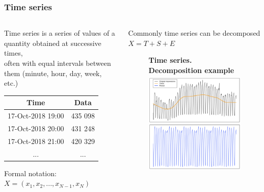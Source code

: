 \documentclass[intlimits, 9pt, unicode]{beamer}
\begin{document}
\begin{frame}
    \frametitle{Time series}
	
    {\begin{columns}
        \begin{column}{5.5cm}
 Time series is a series of values of a quantity obtained at successive times,\\ often with equal intervals between them (minute, hour, day, week, etc.)

\vspace{0.3cm}
\begin{table}[h!]
\centering
 \begin{tabular}{||c c||}
 \hline
 Time & Data \\ [0.5ex]
 \hline\hline
 17-Oct-2018 19:00 & 435 098 \\
 \hline
 17-Oct-2018 20:00 & 431 248  \\
 \hline
 17-Oct-2018 21:00 & 420 329  \\
 \hline
 ... & ... \\ [1ex]
 \hline
\end{tabular}
\end{table}

	
\vspace{0.3cm} Formal notation:
 $ X = (x_1, x_2, ... , x_{N-1} , x_N)  $

        \end{column}

\hspace{-0.5cm}
        \begin{column}{5cm}
Commonly time series can be decomposed $X = T + S + E$
        \begin{figure}
        \centering
	\textbf{Time series. Decomposition example}
        \includegraphics[height=5cm]{images/impressions_stl_3}
	\end{figure}
	
        \end{column}
    \end{columns}}
\end{frame}
\end{document}
